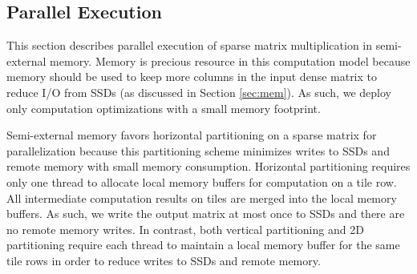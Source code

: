 
\subsection{Parallel Execution} \label{sec:exec}
This section describes parallel execution of sparse matrix multiplication
in semi-external memory. Memory is precious resource in this computation model
because memory should be used to keep more columns in the input dense matrix
to reduce I/O from SSDs (as discussed in Section \ref{sec:mem}).
As such, we deploy only computation optimizations with a small memory footprint.

Semi-external memory favors horizontal partitioning on a sparse matrix
for parallelization because this partitioning scheme minimizes writes to SSDs
and remote memory with small memory consumption. Horizontal partitioning
requires only one thread to allocate local memory buffers for computation on
a tile row. All intermediate computation results on tiles are merged into
the local memory buffers. As such, we write the output matrix at most once
to SSDs and there are no remote memory writes.
In contrast, both vertical partitioning and 2D partitioning require each
thread to maintain a local memory buffer for the same tile rows in order
to reduce writes to SSDs and remote memory.

